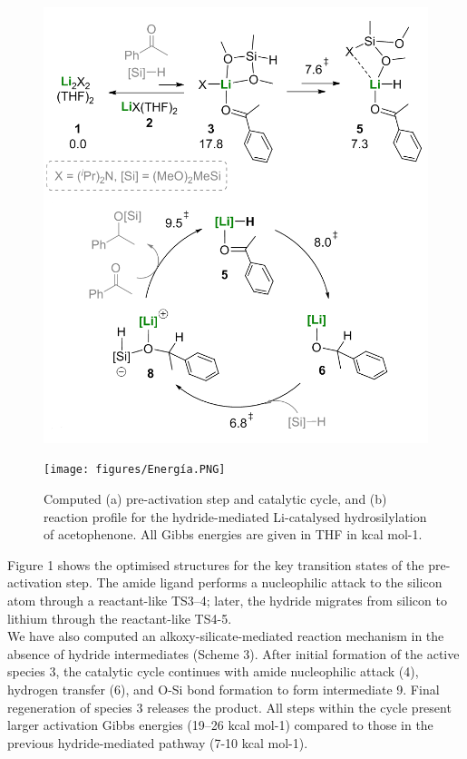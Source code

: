 \documentclass[journal=jacsat,manuscript=article]{achemso}
\begin{document}
	\begin{center}
		\begin{minipage}{0.6\textwidth} 
			\begin{figure}[H]
				\includegraphics[width=\textwidth]{figures/Ciclo.PNG}
			\end{figure}
		\end{minipage}
		
		\begin{minipage}{0.6\textwidth} 
			\begin{figure}[H]
				\texttt{[image: figures/Energía.PNG]}
				\caption{\label{Figure 1} Computed (a) pre-activation step and catalytic cycle, and (b) reaction profile for the hydride-mediated Li-catalysed hydrosilylation of acetophenone. All Gibbs energies are given in THF in kcal mol-1.}
			\end{figure}
		\end{minipage}
	\end{center}
	
	Figure 1 shows the optimised structures for the key transition states of the pre-activation step. The amide ligand performs a nucleophilic attack to the silicon atom through a reactant-like TS3–4; later, the hydride migrates from silicon to lithium	through the reactant-like TS4-5.
	\\
	We have also computed an alkoxy-silicate-mediated reaction mechanism in the absence of hydride intermediates (Scheme 3). After initial formation of the active species 3, the catalytic cycle continues with amide nucleophilic attack (4), hydrogen transfer (6), and O-Si bond formation to form intermediate 9. Final regeneration of species 3 releases the product. All steps within the cycle present larger activation Gibbs energies	(19–26 kcal mol-1) compared to those in the previous hydride-mediated pathway (7-10 kcal mol-1).
	
\end{document}
